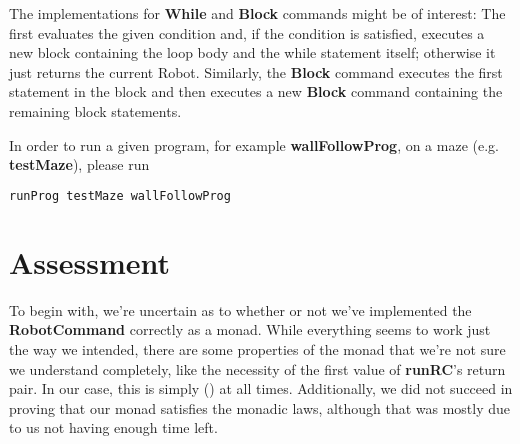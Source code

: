 \documentclass[a4paper]{article}
\newcommand{\func}[1]{\textbf{\ttfamily #1}\xspace}
\begin{document}
The implementations for \func{While} and \func{Block} commands might be of interest: The first evaluates the given condition and, if the condition is satisfied, executes a new block containing the loop body and the while statement itself; otherwise it just returns the current Robot. Similarly, the \func{Block} command executes the first statement in the block and then executes a new \func{Block} command containing the remaining block statements.

In order to run a given program, for example \textbf{wallFollowProg}, on a maze (e.g. \textbf{testMaze}), please run
\begin{lstlisting}[language=haskell]
  runProg testMaze wallFollowProg
\end{lstlisting} 

\newpage
\section{Assessment}


To begin with, we're uncertain as to whether or not we've implemented the \func{RobotCommand} correctly as a monad. While everything seems to work just the way we intended, there are some properties of the monad that we're not sure we understand completely, like the necessity of the first value of \textbf{runRC}'s return pair. In our case, this is simply () at all times. Additionally, we did not succeed in proving that our monad satisfies the monadic laws, although that was mostly due to us not having enough time left. 
\end{document}
